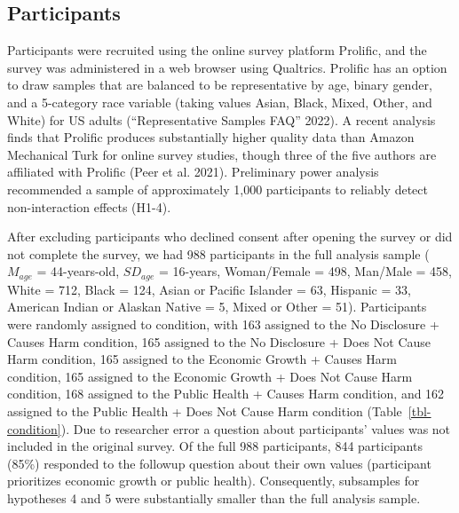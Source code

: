 \documentclass[
  letterpaper,
  DIV=11,
  numbers=noendperiod]{scrartcl}
\begin{document}
\hypertarget{participants}{%
\subsection{Participants}\label{participants}}

Participants were recruited using the online survey platform Prolific,
and the survey was administered in a web browser using Qualtrics.
Prolific has an option to draw samples that are balanced to be
representative by age, binary gender, and a 5-category race variable
(taking values Asian, Black, Mixed, Other, and White) for US adults
({``Representative Samples FAQ''} 2022). A recent analysis finds that
Prolific produces substantially higher quality data than Amazon
Mechanical Turk for online survey studies, though three of the five
authors are affiliated with Prolific (Peer et al. 2021). Preliminary
power analysis recommended a sample of approximately 1,000 participants
to reliably detect non-interaction effects (H1-4).

After excluding participants who declined consent after opening the
survey or did not complete the survey, we had 988 participants in the
full analysis sample (\(M_{age}\) = 44-years-old, \(SD_{age}\) =
16-years, Woman/Female = 498, Man/Male = 458, White = 712, Black = 124,
Asian or Pacific Islander = 63, Hispanic = 33, American Indian or
Alaskan Native = 5, Mixed or Other = 51). Participants were randomly
assigned to condition, with 163 assigned to the No Disclosure + Causes
Harm condition, 165 assigned to the No Disclosure + Does Not Cause Harm
condition, 165 assigned to the Economic Growth + Causes Harm condition,
165 assigned to the Economic Growth + Does Not Cause Harm condition, 168
assigned to the Public Health + Causes Harm condition, and 162 assigned
to the Public Health + Does Not Cause Harm condition
(Table~\ref{tbl-condition}). Due to researcher error a question about
participants' values was not included in the original survey. Of the
full 988 participants, 844 participants (85\%) responded to the followup
question about their own values (participant prioritizes economic growth
or public health). Consequently, subsamples for hypotheses 4 and 5 were
substantially smaller than the full analysis sample.
\end{document}
